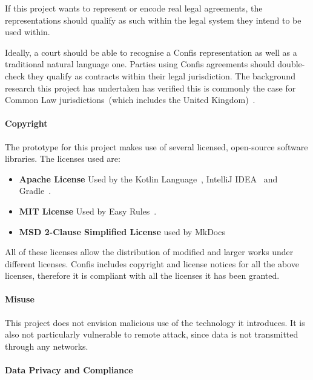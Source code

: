 If this project wants to represent or encode real legal agreements, the representations should qualify as such within the legal system they intend to be used within.

Ideally, a court should be able to recognise a Confis representation as well as a
traditional natural language one.
Parties using Confis agreements should double-check they qualify as contracts within their legal jurisdiction.
The background research this project has undertaken has verified this is commonly the case for Common Law jurisdictions~(which includes the United Kingdom)~\cite{larsonContractLawIntro, contractDef2018precedent, contractDefinition}.

\paragraph{Copyright}\label{par:copyright}

The prototype for this project makes use of several licensed, open-source software
libraries.
The licenses used are:
\begin{itemize}
    \item \textbf{Apache License} Used by the Kotlin Language~\cite{kotlinLang}, IntelliJ IDEA~\cite{intelliJRepo} and Gradle~\cite{gradleDSL}.
    \item \textbf{MIT License} Used by Easy Rules~\cite{easyRules}.
    \item \textbf{MSD 2-Clause Simplified License} used by MkDocs~\cite{mkDocs}
\end{itemize}

All of these licenses allow the distribution of modified and larger works under different licenses.
Confis includes copyright and license notices for all the above licenses, therefore it is compliant with all the licenses it has been granted.

\paragraph{Misuse}\label{par:misuse}

This project does not envision malicious use of the technology it introduces.
It is also not particularly vulnerable to remote attack, since data is not transmitted through any networks.


\paragraph{Data Privacy and Compliance}\label{par:data-privacy-compliance}

